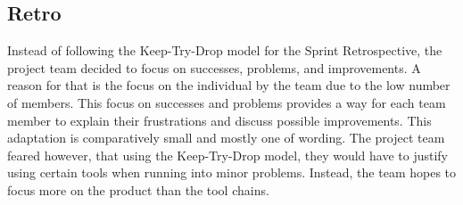 \subsection{Retro}\label{subsec:retro}
Instead of following the Keep-Try-Drop model for the Sprint Retrospective, the project team decided to focus on successes, problems, and improvements.
A reason for that is the focus on the individual by the team due to the low number of members.
This focus on successes and problems provides a way for each team member to explain their frustrations and discuss possible improvements.
This adaptation is comparatively small and mostly one of wording.
The project team feared however, that using the Keep-Try-Drop model, they would have to justify using certain tools when running into minor problems.
Instead, the team hopes to focus more on the product than the tool chains.
